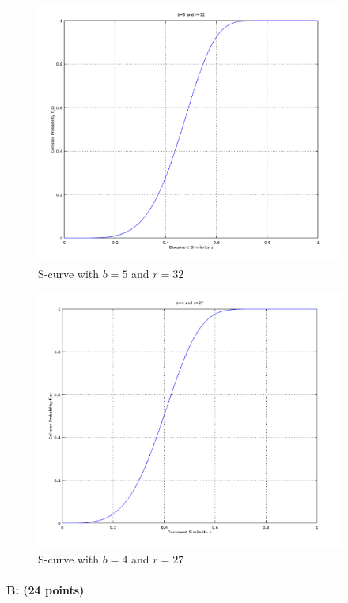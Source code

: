 \documentclass[11pt]{article}
\begin{document}
\begin{figure}[!htb]
\centering
\includegraphics[width=4in]{figures/1stCut.png}
\caption{S-curve with $b=5$ and $r=32$}
\label{1stCut}
\end{figure}

\begin{figure}[!htb]
\centering
\includegraphics[width=4in]{figures/final.png}
\caption{S-curve with $b=4$ and $r=27$}
\label{final}
\end{figure}
\paragraph{B: (24 points)} 
\end{document}
